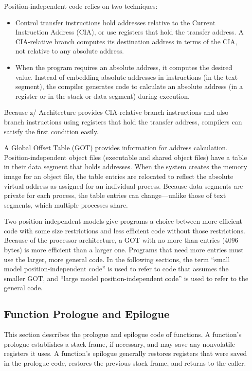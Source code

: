 \documentclass[USenglish,fontsize=11pt,twoside,%
  toc=bib,toc=idx,toc=graduated,numbers=noendperiod,
  bookmarks=true,
  bookmarksnumbered=true,
  bookmarksopen=true,
  bookmarksopenlevel=1,
  breaklinks=true,
  colorlinks=true,
  linkcolor=black,
  pdfpagelayout={TwoPageRight},
  pdfusetitle=true
]{scrreprt}
\newcommand{\ARCH}{z/\kern-1pt Ar\-chi\-tec\-ture}
\newcommand{\ARCHarch}{\ARCH}
\newcommand{\ARCH}{ESA/390}
\newcommand{\ARCHarch}{the \ARCH{} ar\-chi\-tec\-ture}
\begin{document}
Position-independent code relies on two techniques:
\begin{itemize}
\item Control transfer instructions hold addresses relative to the
  Current Instruction Address (CIA), or use registers that hold the
  transfer address.  A CIA-relative branch computes its destination
  address in terms of the CIA, not relative to any absolute address.
\item When the program requires an absolute address, it computes the
  desired value.  Instead of embedding absolute addresses in
  instructions (in the text segment), the compiler generates code to
  calculate an absolute address (in a register or in the stack or data
  segment) during execution.
\end{itemize}

Because \ARCHarch{}
provides CIA-relative branch instructions and also branch instructions
using registers that hold the transfer address, compilers can satisfy
the first condition easily.

A Global Offset Table (GOT) provides information for address
calculation.  Position-independent object files (executable and shared
object files) have a table in their data segment that holds
addresses.  When the system creates the memory image for an object
file, the table entries are relocated to reflect the absolute virtual
address as assigned for an individual process.  Because data segments
are private for each process, the table entries can change---unlike
those of text segments, which multiple processes share.

Two position-independent models give programs a choice between more
efficient code with some size restrictions and less efficient code
without those restrictions.  Because of the processor architecture, a
GOT with no more than {\fi} entries (4096
bytes) is more efficient than a larger one.  Programs that need more
entries must use the larger, more general code.  In the following
sections, the term ``small model position-independent code'' is used
to refer to code that assumes the smaller GOT, and ``large model
position-independent code'' is used to refer to the general code.

\subsection{Function Prologue and Epilogue}
This section describes the prologue and epilogue code of functions.  A
function's prologue establishes a stack frame, if necessary, and may
save any nonvolatile registers it uses.  A function's epilogue generally
restores registers that were saved in the prologue code, restores the
previous stack frame, and returns to the caller.
\end{document}
